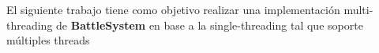 El siguiente trabajo tiene como objetivo realizar una implementación multi-threading de \textbf{BattleSystem} en base a la single-threading tal que soporte múltiples threads

